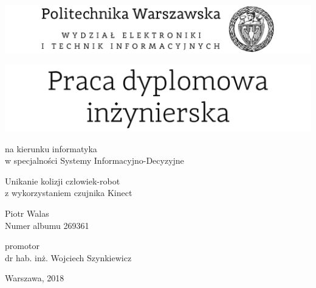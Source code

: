 
\begin{titlepage}
\begin{center}
\includegraphics[width=1.0\textwidth]{gfx/pw_logo.jpg}

\vfill

\includegraphics[width=1.0\textwidth]{gfx/pdi.png}
\end{center}
\begin{center}
\large
na kierunku informatyka \\
w specjalności Systemy Informacyjno-Decyzyjne
\end{center}
\vfill
\begin{center}
\Huge
Unikanie kolizji człowiek-robot \\
z wykorzystaniem czujnika Kinect
\end{center}


\vfill
\begin{center}
\Huge
Piotr Walas\\
\large
Numer albumu 269361
\end{center}

\vfill
\begin{center}
\large
promotor \\
\large
dr hab. inż. Wojciech Szynkiewicz
\end{center}

\vfill
\begin{center}
\large
Warszawa, 2018
\end{center}

\end{titlepage}